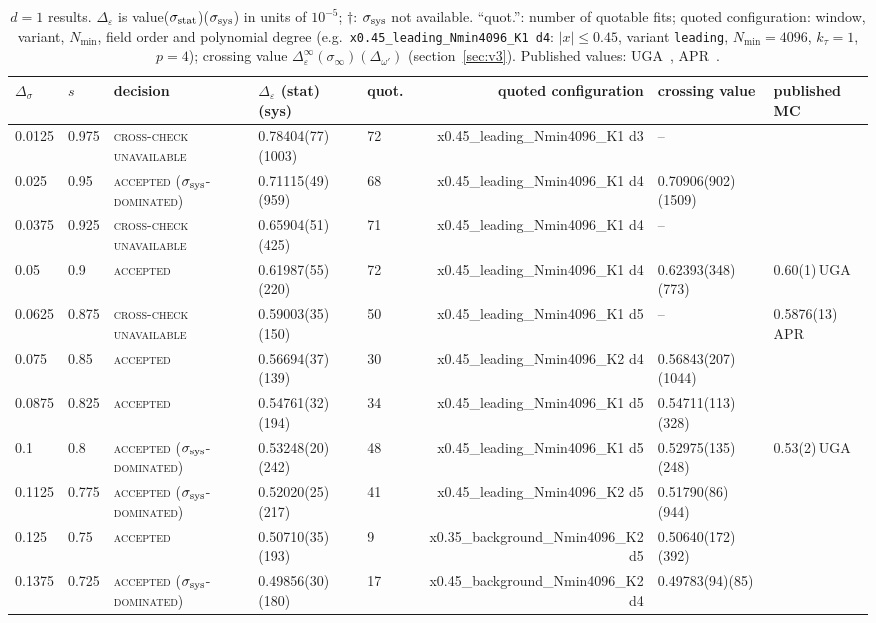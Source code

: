 \documentclass[10pt,a4paper]{article}
\newcommand{\Ds}{\Delta_\sigma}
\newcommand{\De}{\Delta_\varepsilon}
\newcommand{\code}[1]{\texttt{#1}}
\newcommand{\lbl}[1]{{\mdseries\scshape #1}}
\newcommand{\sstat}{\sigma_{\rm stat}}
\newcommand{\ssys}{\sigma_{\rm sys}}
\newcommand{\ktau}{k_\tau}
\begin{document}
\begin{table}\centering\footnotesize
\caption{$d=1$ results. $\De$ is value($\sstat$)($\ssys$) in units of $10^{-5}$; $\dagger$: $\ssys$ not available. ``quot.'': number of quotable
fits; quoted configuration: window, variant, $N_{\min}$, field order and polynomial degree (e.g.\ \code{x0.45\_leading\_Nmin4096\_K1 d4}:
$|x|\le0.45$, variant \code{leading}, $N_{\min}=4096$, $\ktau=1$, $p=4$); crossing value $\De^\infty(\sigma_\infty)(\Delta_{\omega'})$
(section~\ref{sec:v3}). Published values: UGA~\cite{Uzelac:2001lc}, APR~\cite{Angelini:2014koy}.}\label{tab:1dfinal}
\begin{tabular}{@{}lllllrll@{}}\toprule
$\Ds$ & $s$ & decision & $\De$ (stat)(sys) & quot. & quoted configuration & crossing value & published MC \\\midrule
0.0125 & 0.975 & \lbl{cross-check unavailable} & 0.78404(77)(1003) & 72 & x0.45\_leading\_Nmin4096\_K1 d3 & -- &  \\
0.025 & 0.95 & \lbl{accepted ($\sigma_{\rm sys}$-dominated)} & 0.71115(49)(959) & 68 & x0.45\_leading\_Nmin4096\_K1 d4 & 0.70906(902)(1509) &  \\
0.0375 & 0.925 & \lbl{cross-check unavailable} & 0.65904(51)(425) & 71 & x0.45\_leading\_Nmin4096\_K1 d4 & -- &  \\
0.05 & 0.9 & \lbl{accepted} & 0.61987(55)(220) & 72 & x0.45\_leading\_Nmin4096\_K1 d4 & 0.62393(348)(773) & 0.60(1)\,UGA \\
0.0625 & 0.875 & \lbl{cross-check unavailable} & 0.59003(35)(150) & 50 & x0.45\_leading\_Nmin4096\_K1 d5 & -- & 0.5876(13)\,APR \\
0.075 & 0.85 & \lbl{accepted} & 0.56694(37)(139) & 30 & x0.45\_leading\_Nmin4096\_K2 d4 & 0.56843(207)(1044) &  \\
0.0875 & 0.825 & \lbl{accepted} & 0.54761(32)(194) & 34 & x0.45\_leading\_Nmin4096\_K1 d5 & 0.54711(113)(328) &  \\
0.1 & 0.8 & \lbl{accepted ($\sigma_{\rm sys}$-dominated)} & 0.53248(20)(242) & 48 & x0.45\_leading\_Nmin4096\_K1 d5 & 0.52975(135)(248) & 0.53(2)\,UGA \\
0.1125 & 0.775 & \lbl{accepted ($\sigma_{\rm sys}$-dominated)} & 0.52020(25)(217) & 41 & x0.45\_leading\_Nmin4096\_K2 d5 & 0.51790(86)(944) &  \\
0.125 & 0.75 & \lbl{accepted} & 0.50710(35)(193) & 9 & x0.35\_background\_Nmin4096\_K2 d5 & 0.50640(172)(392) &  \\
0.1375 & 0.725 & \lbl{accepted ($\sigma_{\rm sys}$-dominated)} & 0.49856(30)(180) & 17 & x0.45\_background\_Nmin4096\_K2 d4 & 0.49783(94)(85) &  \\

\end{tabular}
\end{table}
\end{document}
